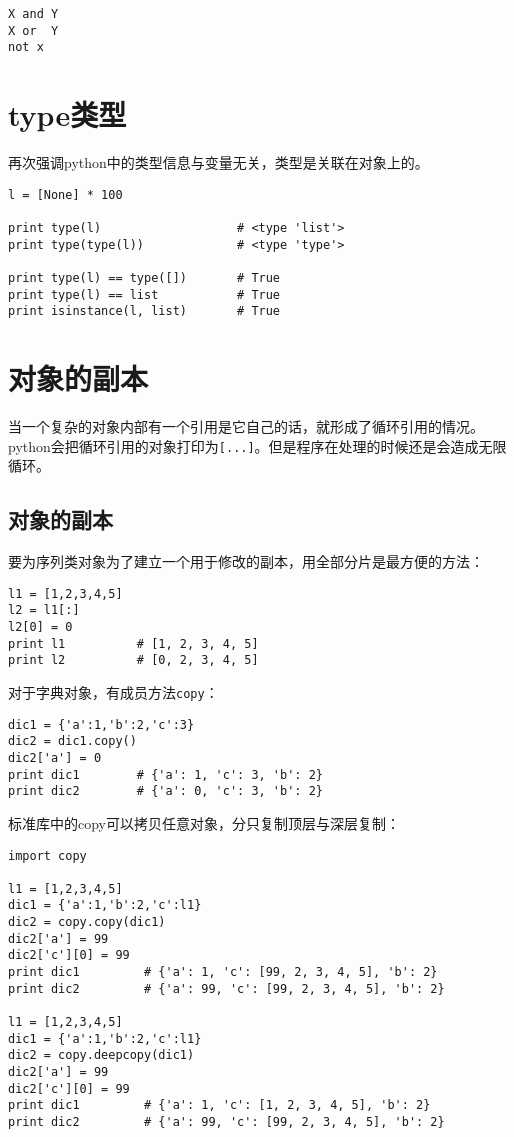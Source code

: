 \begin{lstlisting}
X and Y
X or  Y
not x
\end{lstlisting}

\section{type类型}

再次强调python中的类型信息与变量无关，类型是关联在对象上的。

\begin{lstlisting}
l = [None] * 100

print type(l)                   # <type 'list'>
print type(type(l))             # <type 'type'>

print type(l) == type([])       # True
print type(l) == list           # True
print isinstance(l, list)       # True
\end{lstlisting}

\section{对象的副本}

当一个复杂的对象内部有一个引用是它自己的话，就形成了循环引用的情况。python会把循环引用的对象打印为\verb|[...]|。但是程序在处理的时候还是会造成无限循环。	

\subsection{对象的副本}

要为序列类对象为了建立一个用于修改的副本，用全部分片是最方便的方法：

\begin{lstlisting}
l1 = [1,2,3,4,5]
l2 = l1[:]
l2[0] = 0
print l1          # [1, 2, 3, 4, 5]
print l2          # [0, 2, 3, 4, 5]
\end{lstlisting}

对于字典对象，有成员方法\verb|copy|：

\begin{lstlisting}
dic1 = {'a':1,'b':2,'c':3}
dic2 = dic1.copy()
dic2['a'] = 0
print dic1        # {'a': 1, 'c': 3, 'b': 2}
print dic2        # {'a': 0, 'c': 3, 'b': 2}
\end{lstlisting}

标准库中的copy可以拷贝任意对象，分只复制顶层与深层复制：

\begin{lstlisting}
import copy

l1 = [1,2,3,4,5]
dic1 = {'a':1,'b':2,'c':l1}
dic2 = copy.copy(dic1)
dic2['a'] = 99
dic2['c'][0] = 99
print dic1         # {'a': 1, 'c': [99, 2, 3, 4, 5], 'b': 2}
print dic2         # {'a': 99, 'c': [99, 2, 3, 4, 5], 'b': 2}

l1 = [1,2,3,4,5]
dic1 = {'a':1,'b':2,'c':l1}
dic2 = copy.deepcopy(dic1)
dic2['a'] = 99
dic2['c'][0] = 99
print dic1         # {'a': 1, 'c': [1, 2, 3, 4, 5], 'b': 2}
print dic2         # {'a': 99, 'c': [99, 2, 3, 4, 5], 'b': 2}
\end{lstlisting}

